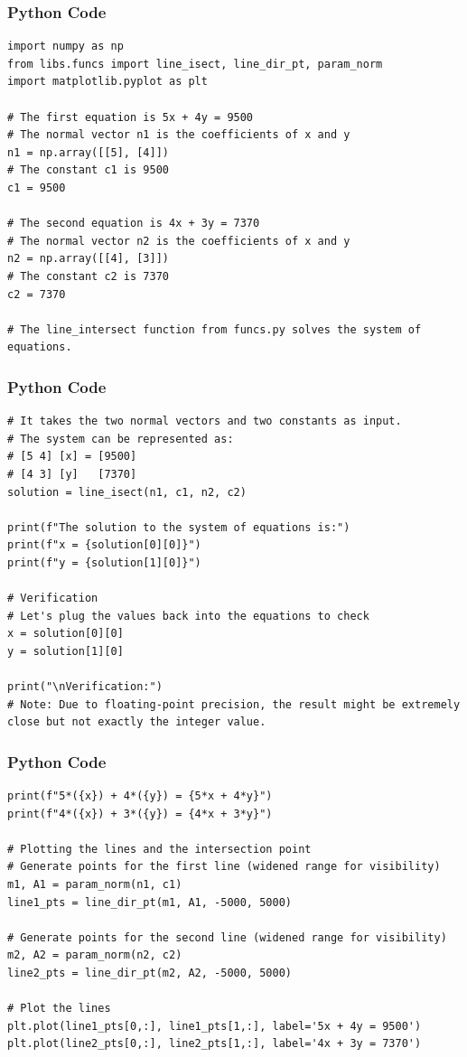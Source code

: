 \documentclass{beamer}
\begin{document}
\begin{frame}[fragile]
\frametitle{Python Code}
\begin{lstlisting}
import numpy as np
from libs.funcs import line_isect, line_dir_pt, param_norm
import matplotlib.pyplot as plt

# The first equation is 5x + 4y = 9500
# The normal vector n1 is the coefficients of x and y
n1 = np.array([[5], [4]])
# The constant c1 is 9500
c1 = 9500

# The second equation is 4x + 3y = 7370
# The normal vector n2 is the coefficients of x and y
n2 = np.array([[4], [3]])
# The constant c2 is 7370
c2 = 7370

# The line_intersect function from funcs.py solves the system of equations.
\end{lstlisting}
\end{frame}
\begin{frame}[fragile]
\frametitle{Python Code}
\begin{lstlisting}
# It takes the two normal vectors and two constants as input.
# The system can be represented as:
# [5 4] [x] = [9500]
# [4 3] [y]   [7370]
solution = line_isect(n1, c1, n2, c2)

print(f"The solution to the system of equations is:")
print(f"x = {solution[0][0]}")
print(f"y = {solution[1][0]}")

# Verification
# Let's plug the values back into the equations to check
x = solution[0][0]
y = solution[1][0]

print("\nVerification:")
# Note: Due to floating-point precision, the result might be extremely close but not exactly the integer value.
\end{lstlisting}
\end{frame}
\begin{frame}[fragile]
\frametitle{Python Code}
\begin{lstlisting}
print(f"5*({x}) + 4*({y}) = {5*x + 4*y}")
print(f"4*({x}) + 3*({y}) = {4*x + 3*y}")

# Plotting the lines and the intersection point
# Generate points for the first line (widened range for visibility)
m1, A1 = param_norm(n1, c1)
line1_pts = line_dir_pt(m1, A1, -5000, 5000)

# Generate points for the second line (widened range for visibility)
m2, A2 = param_norm(n2, c2)
line2_pts = line_dir_pt(m2, A2, -5000, 5000)

# Plot the lines
plt.plot(line1_pts[0,:], line1_pts[1,:], label='5x + 4y = 9500')
plt.plot(line2_pts[0,:], line2_pts[1,:], label='4x + 3y = 7370')
\end{lstlisting}
\end{frame}
\end{document}
